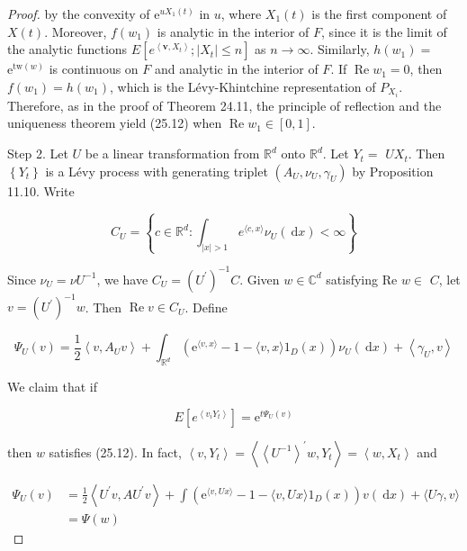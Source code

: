 \documentclass[a4paper,11pt]{article}
\begin{document}
\begin{proof}
    by the convexity of $\mathrm{e}^{u X_{1}(t)}$ in $u$, where $X_{1}(t)$ is the first component of $X(t)$.
    Moreover, $f\left(w_{1}\right)$ is analytic in the interior of $F$, since it is the limit of the analytic
    functions $E\left[e^{\left\langle\boldsymbol{v}, X_{t}\right\rangle} ;\left|X_{t}\right| \leq n\right]$ as $n \rightarrow \infty$.
    Similarly, $h\left(w_{1}\right)=$ $\mathrm{e}^{\mathrm{tw}(w)}$ is continuous on $F$ and analytic in the interior of $F$.
    If $\operatorname{Re} w_{1}=0$, then $f\left(w_{1}\right)=h\left(w_{1}\right)$, which is the Lévy-Khintchine representation
    of $P_{X_{i}}$. Therefore, as in the proof of Theorem 24.11, the principle of reflection and the uniqueness theorem yield (25.12)
    when $\operatorname{Re} w_{1} \in[0,1]$.

    Step 2. Let $U$ be a linear transformation from $\mathbb{R}^{d}$ onto $\mathbb{R}^{d}$. Let $Y_{t}=$ $U X_{t}$.
    Then $\left\{Y_{t}\right\}$ is a Lévy process with generating triplet $\left(A_{U}, \nu_{U}, \gamma_{U}\right)$
    by Proposition 11.10. Write

    $$
        C_{U}=\left\{c \in \mathbb{R}^{d}: \int_{|x|>1} e^{\langle c, x\rangle} \nu_{U}(\mathrm{~d} x)<\infty\right\}
    $$

    Since $\nu_{U}=\nu U^{-1}$, we have $C_{U}=\left(U^{\prime}\right)^{-1} C$. Given $w \in \mathbb{C}^{d}$
    satisfying Re $w \in$ $C$, let $v=\left(U^{\prime}\right)^{-1} w$. Then $\operatorname{Re} v \in C_{U}$. Define

    $$
        \Psi_{U}(v)=\frac{1}{2}\left\langle v, A_{U} v\right\rangle+\int_{\mathbb{R}^{d}}\left(\mathrm{e}^{\langle v, x\rangle}-1-\langle v, x\rangle 1_{D}(x)\right) \nu_{U}(\mathrm{~d} x)+\left\langle\gamma_{U}, v\right\rangle
    $$

    We claim that if

    \begin{equation*}
        E\left[e^{\left\langle v_{i} Y_{t}\right\rangle}\right]=\mathrm{e}^{t \Psi_{U}(v)} \tag{25.13}
    \end{equation*}

    then $w$ satisfies (25.12). In fact, $\left\langle v, Y_{t}\right\rangle=\left\langle\left\langle U^{-1}\right\rangle^{\prime} w, Y_{t}\right\rangle=\left\langle w, X_{t}\right\rangle$
    and

    $$
        \begin{aligned}
            \Psi_{U}(v) & =\frac{1}{2}\left\langle U^{\prime} v, A U^{\prime} v\right\rangle+\int\left(\mathrm{e}^{\langle v, U x\rangle}-1-\langle v, U x\rangle 1_{D}(x)\right) v(\mathrm{~d} x)+\langle U \gamma, v\rangle \\
                        & =\Psi(w)
        \end{aligned}
    $$


\end{proof}
\end{document}
